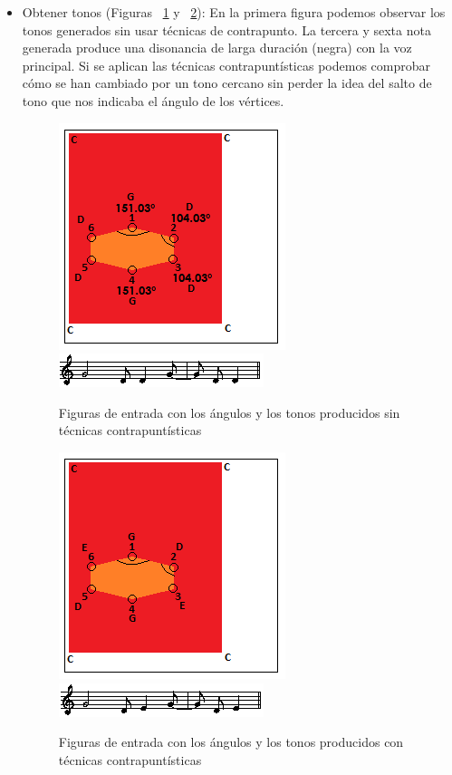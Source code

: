 \begin{itemize}
	\item Obtener tonos (Figuras ~\ref{fig:Figura3Voz2} y ~\ref{fig:Figura4Voz2}): En la primera figura podemos observar los tonos generados sin usar técnicas de contrapunto. La tercera y sexta nota generada produce una disonancia de larga duración (negra) con la voz principal. Si se aplican las técnicas contrapuntísticas podemos comprobar cómo se han cambiado por un tono cercano sin perder la idea del salto de tono que nos indicaba el ángulo de los vértices.

		\begin{figure}[htbp]
		\centering
		\hspace*{0.0in}
		\includegraphics[scale=1]{graphics/simpletest4-F3.png}
		\includegraphics[scale=1]{graphics/simpletest4-F3-MEL2partitura.png}
		\caption{Figuras de entrada con los ángulos y los tonos producidos sin técnicas contrapuntísticas}
		\label{fig:Figura3Voz2}
		\end{figure}

		\begin{figure}[htbp]
		\centering
		\hspace*{0.0in}
		\includegraphics[scale=1]{graphics/simpletest4-F3_2.png}
		\includegraphics[scale=1]{graphics/simpletest4-F3_2-MEL2partitura.png}
		\caption{Figuras de entrada con los ángulos y los tonos producidos con técnicas contrapuntísticas}
		\label{fig:Figura4Voz2}
		\end{figure}


\end{itemize}

